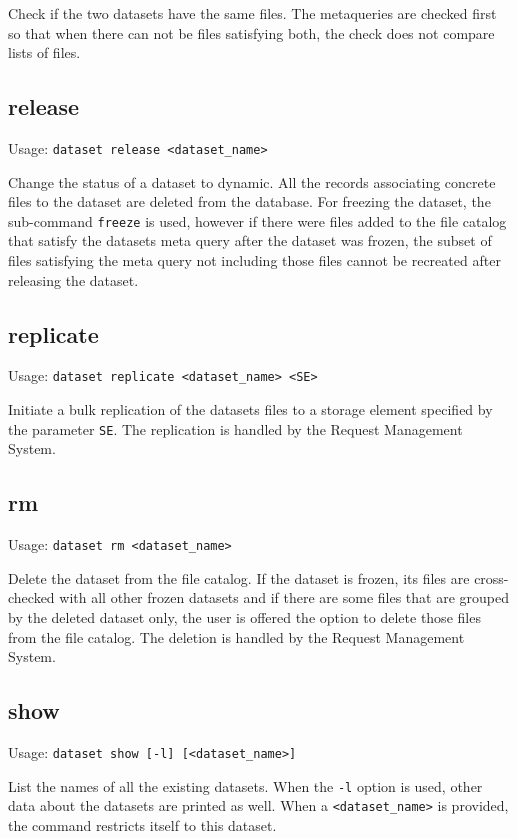 Check if the two datasets have the same files. The metaqueries are
checked first so that when there can not be files satisfying both,
the check does not compare lists of files.

\pagebreak

\subsection{release}

Usage: \texttt{dataset release <dataset\_name>}

Change the status of a dataset to dynamic. All the records
associating concrete files to the dataset are deleted from the
database. For freezing the dataset, the sub-command \texttt{freeze}
is used, however if there were files added to the file catalog that
satisfy the datasets meta query after the dataset was frozen, the
subset of files satisfying the meta query not including those files
cannot be recreated after releasing the dataset.

\subsection{replicate}

Usage: \texttt{dataset replicate <dataset\_name> <SE>}

Initiate a bulk replication of the datasets files to a storage
element specified by the parameter \texttt{SE}. The replication
is handled by the Request Management System.

\subsection{rm}

Usage: \texttt{dataset rm <dataset\_name>}

Delete the dataset from the file catalog. If the dataset is
frozen, its files are cross-checked with all other frozen datasets
and if there are some files that are grouped by the deleted dataset
only, the user is offered the option to delete those files from the
file catalog. The deletion is handled by the Request Management
System.

\subsection{show}

Usage: \texttt{dataset show [-l] [<dataset\_name>]}

List the names of all the existing datasets. When the \texttt{-l}
option is used, other data about the datasets are printed as well.
When a \texttt{<dataset\_name>} is provided, the command restricts
itself to this dataset.

